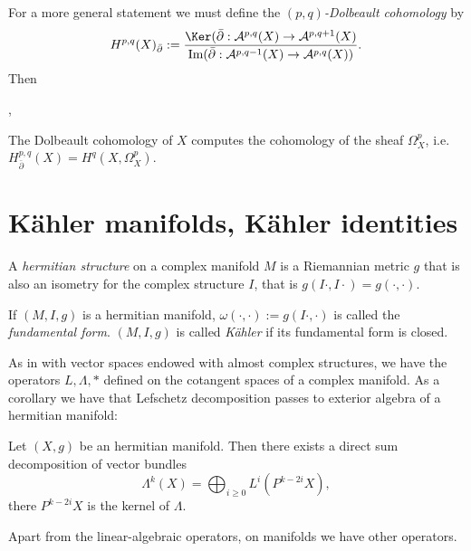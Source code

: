\documentclass{book}
\begin{document}
\noindent
For a more general statement we must define
the {\it $(p,q)$-Dolbeault cohomology} by
 $$
H^{p,q}(X)_{\bar\partial}
:=\frac{\Ker
(\bar\partial:\mathcal{A}^{p,q}(X) \to
\mathcal{A}^{p,q+1}(X)}
{\text{Im}(\bar\partial:\mathcal{A}^{p,q-1}
(X)
\to \mathcal{A}^{p,q}(X))}.
$$
Then

\begin{theorem}[Dolbeault]
\label{theorem-dolbeault}
\begin{reference}
\cite[Corollary 2.6.21]{huc}, \cite[Theorem
4.2]{voi}
\end{reference}
The Dolbeault cohomology of $X$ computes the
cohomology
of the sheaf $\Omega^p_X$, i.e.
$H^{p,q}_{\bar\partial}(X)=H^q(X,\Omega^p_X)
$.
\end{theorem}



\section{Kähler manifolds, Kähler identities}
\label{section-kahler}


\begin{definition}
\label{definition-hermitian-structure}
A {\it hermitian structure} on a complex
manifold $M$
is a Riemannian metric $g$ that is also an
isometry for
the complex structure $I$, that is
$g(I\cdot,I\cdot)=g(\cdot,\cdot)$.
\end{definition}

\begin{definition}
\label{definition-fundamental-form}
If $(M,I,g)$ is a hermitian manifold,
$\omega(\cdot,\cdot):=g(I\cdot,\cdot)$
is called the {\it fundamental form}.
$(M,I,g)$ is called {\it Kähler} if its
fundamental form
is closed.
\end{definition}

\noindent
As in with vector spaces endowed with almost
complex structures,
we have the operators $L,\Lambda,*$ defined
on the
cotangent spaces of a complex manifold.
As a corollary we have that Lefschetz
decomposition
passes to exterior algebra
of a hermitian manifold:

\begin{lemma}
\label{lemma-lefsc-decom-manif}
Let $(X,g)$ be an hermitian manifold.
Then there exists a direct sum decomposition
of vector bundles
$$
\Lambda^k(X)=\bigoplus_{i\geq
0}L^i(P^{k-2i}X),
$$
there $P^{k-2i}X$ is the kernel of $\Lambda$.
\end{lemma}

\medskip\noindent
Apart from the linear-algebraic operators,
on manifolds we have other operators.
\end{document}

